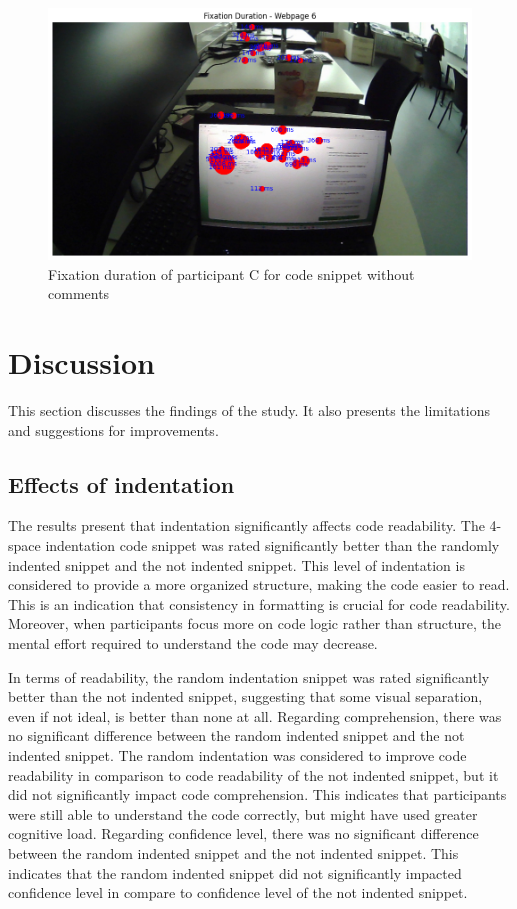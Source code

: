 \begin{figure} [H]
  \centering
  \includegraphics[scale=0.6]{figures/0-com.png}
  \caption{Fixation duration of  participant C for code snippet without comments}
  \label{fig:AnhangsChor}
\end{figure}





\chapter{Discussion}
This section discusses the findings of the study. It also presents the limitations and suggestions for improvements.


\section{Effects of indentation} 
The results present that indentation significantly affects code readability. The 4-space indentation code snippet was rated significantly better than the randomly indented snippet and the not indented snippet. This level of indentation is considered to provide a more organized structure, making the code easier to read. This is an indication that consistency in formatting is crucial for code readability. Moreover, when participants focus more on code logic rather than structure, the mental effort required to understand the code may decrease.


In terms of readability, the random indentation snippet was rated significantly better than the not indented snippet, suggesting that some visual separation, even if not ideal, is better than none at all.  Regarding comprehension, there was no significant difference between the random indented snippet and the not indented snippet. The random indentation was considered to improve code readability in comparison to code readability of the not indented snippet, but it did not significantly impact code comprehension.  This indicates that participants were still able to understand the code correctly, but might have used greater cognitive load. Regarding confidence level, there was no significant difference between the random indented snippet and the not indented snippet. This indicates that the random indented snippet did not significantly impacted confidence level in compare to confidence level of the not indented snippet. 


